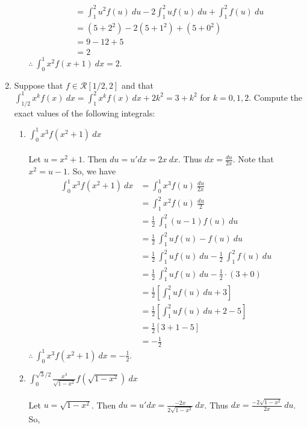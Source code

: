 \documentclass[12pt,letterpaper]{article}
\theoremstyle{case}
\theoremstyle{definition}
\begin{document}
\begin{enumerate}
\begin{enumerate}
\begin{align*}
				&= \int_{1}^{2} u^2f(u)\ du -2\int_{1}^{2} uf(u)\ du +\int_{1}^{2} f(u)\ du \\
				&= (5+2^2)-2(5+1^2)+(5+0^2) \\
				&= 9-12+5 \\
				&= 2
			\end{align*}
			$\therefore\ \displaystyle\int_{0}^{1} x^2f(x+1)\ dx = 2$.\\
		\end{enumerate}
		\item Suppose that $f \in \mathcal{R}[1/2, 2]$ and that $\displaystyle\int_{1/2}^{1} x^k f(x)\ dx = \displaystyle\int_{1}^{2} x^kf(x)\ dx + 2k^2 = 3+k^2$ for $k=0,1,2$. Compute the exact values of the following integrals:
		\begin{enumerate}
			\item $\displaystyle\int_{0}^{1} x^3 f(x^2+1)\ dx$\\\\
			Let $u=x^2+1$. Then $du=u'dx = 2x\ dx$. Thus $dx=\frac{du}{2x}$. Note that $x^2=u-1$. So, we have
			\begin{align*}
				\int_{0}^{1} x^3 f(x^2+1)\ dx &= \int_{0}^{1} x^3 f(u)\ \frac{du}{2x} \\
				&= \int_{1}^{2} x^2 f(u)\ \frac{du}{2} \\
				&= \frac{1}{2}\ \int_{1}^{2} (u-1) f(u)\ du \\
				&= \frac{1}{2}\ \int_{1}^{2} uf(u)-f(u)\ du \\
				&= \frac{1}{2}\ \int_{1}^{2} uf(u)\ du - \frac{1}{2}\ \int_{1}^{2} f(u)\ du \\
				&= \frac{1}{2}\ \int_{1}^{2} uf(u)\ du - \frac{1}{2} \cdot (3+0) \\
				&= \frac{1}{2} \left[\int_{1}^{2} uf(u)\ du + 3\right] \\
				&= \frac{1}{2} \left[\int_{1}^{2} u f(u)\ du + 2 - 5\right] \\
				&= \frac{1}{2} [3+1-5] \\
				&= -\frac{1}{2}
			\end{align*}
			$\therefore\ \displaystyle\int_{0}^{1} x^3f(x^2+1)\ dx = -\frac{1}{2}$.\\
			\item $\displaystyle\int_{0}^{\sqrt{3}/2} \frac{x^3}{\sqrt{1-x^2}} f(\sqrt{1-x^2})\ dx$\\\\
			Let $u=\sqrt{1-x^2}$. Then $du=u'dx = \frac{-2x}{2\sqrt{1-x^2}}\ dx$. Thus
			$dx=\frac{-2\sqrt{1-x^2}}{2x}\ du$. So,
			\begin{align*}

\end{align*}
\end{enumerate}
\end{enumerate}
\end{document}
